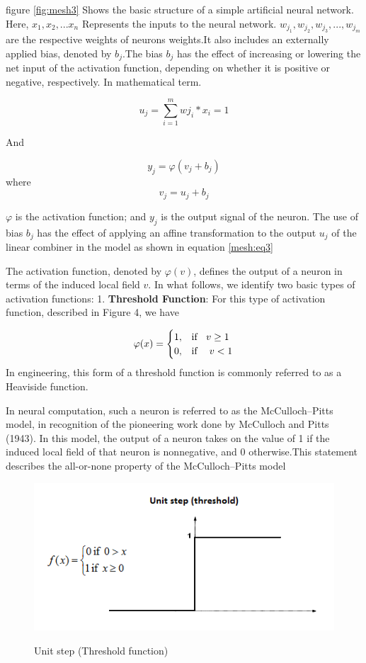 \documentclass[12pt]{article}
\begin{document}
 figure \ref{fig:mesh3}   Shows the basic structure of a simple artificial neural network. Here, $x_1,x_2,... x_n$ Represents the inputs to the neural network. $w_{j_1}, w_{j_2}, w_{j_3},..., w_{j_m}$ are the respective weights of neurons weights.It also includes an externally applied bias, denoted by $b_j$.The bias $b_j$ has the effect of increasing or lowering the net input of the activation function, depending on whether it is positive or negative, respectively. 
 \newpage
 In mathematical term. 
 
 \begin{equation}
 u_j=\sum_{i=1}^{m} w{j_i}*x_i= 1
 \end{equation}
 
 And
 
 \begin{equation}
    y_j= \varphi(v_j+b_j)
 \end{equation}
 where
 \begin{equation}
    v_j=u_j+b_j
    \label{mesh:eq3}
 \end{equation}
 
 $\varphi$ is the activation function; and $y_j$ is the output signal of the neuron. The use of bias $b_j$ has the effect of applying an affine transformation to the output $u_j$ of the linear combiner in the model as shown in equation \ref{mesh:eq3}
 
 The activation function, denoted by $\varphi(v)$, defines the output of a neuron in terms of
the induced local field $v$. In what follows, we identify two basic types of activation functions: 
\vspace{2mm}
1. \textbf{Threshold Function}: For this type of activation function, described in Figure 4, we have 
	
\[
   \varphi(x)= 
\begin{cases}
    1 ,& \text{if\hspace{2mm} } v \geq 1 \\
       0,              & \text{if\hspace{2mm} }  \ v < 1
\end{cases}
\]
In engineering, this form of a threshold function is commonly referred to as a Heaviside
function.

In neural computation, such a neuron is referred to as the McCulloch–Pitts model, in
recognition of the pioneering work done by McCulloch and Pitts (1943). In this model,
the output of a neuron takes on the value of 1 if the induced local field of that neuron
is nonnegative, and 0 otherwise.This statement describes the all-or-none property of the
McCulloch–Pitts model
 \begin{figure}[h]
    	\centering
    	\includegraphics[width=0.35 \textwidth]{d.png}
       	\label{fig:mesh4}
	\caption{Unit step (Threshold function)}
	\end{figure} 
\end{document}
